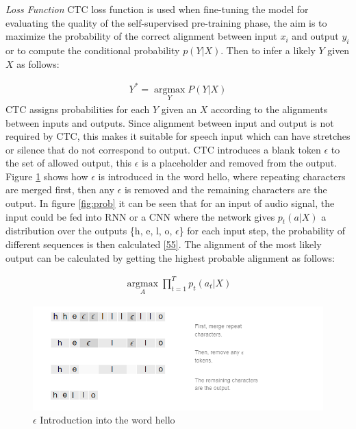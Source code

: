 \documentclass[
  a4paper,
]{article}
\begin{document}
\emph{Loss Function } CTC loss function is used when fine-tuning the
model for evaluating the quality of the self-supervised pre-training
phase, the aim is to maximize the probability of the correct alignment
between input \(x_i\) and output \(y_i\) or to compute the conditional
probability \(p(Y|X)\). Then to infer a likely \(Y\) given \(X\) as
follows:

\begin{align}
Y^* = \underset{Y}{\operatorname{argmax}} P(Y|X)
\end{align} CTC assigns probabilities for each \(Y\) given an \(X\)
according to the alignments between inputs and outputs. Since alignment
between input and output is not required by CTC, this makes it suitable
for speech input which can have stretches or silence that do not
correspond to output. CTC introduces a blank token \(\epsilon\) to the
set of allowed output, this \(\epsilon\) is a placeholder and removed
from the output. Figure \ref{fig:epsilon} shows how \(\epsilon\) is
introduced in the word hello, where repeating characters are merged
first, then any \(\epsilon\) is removed and the remaining characters are
the output. In figure \ref{fig:prob} it can be seen that for an input of
audio signal, the input could be fed into RNN or a CNN where the network
gives \(p_t(a|X)\) a distribution over the outputs \{h, e, l, o,
\(\epsilon\)\} for each input step, the probability of different
sequences is then calculated \protect\hyperlink{ref-ctc}{{[}55{]}}. The
alignment of the most likely output can be calculated by getting the
highest probable alignment as follows:

\begin{align}
\underset{A}{\operatorname{argmax}} \prod_{t=1}^Tp_t(a_t|X)
\end{align}

\begin{figure}

{\centering \includegraphics{epsilon} 

}

\caption{$\epsilon$ Introduction into the word hello}\label{fig:epsilon}
\end{figure}
\end{document}
